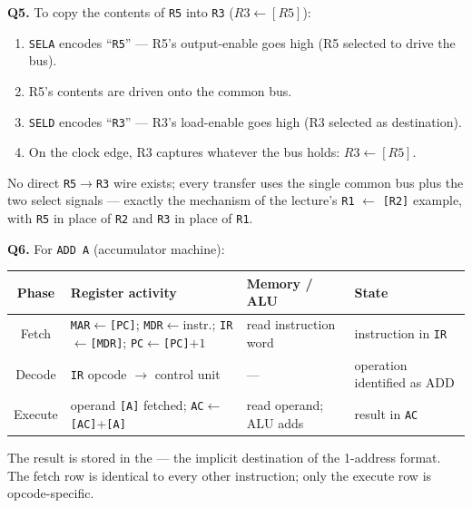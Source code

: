 \documentclass[11pt]{article}
\begin{document}
\textbf{Q5.} To copy the contents of \texttt{R5} into \texttt{R3} ($R3 \gets [R5]$):
\begin{enumerate}
  \item \texttt{SELA} encodes ``\texttt{R5}'' --- R5's output-enable goes high (R5 selected to drive the bus).
  \item R5's contents are driven onto the common bus.
  \item \texttt{SELD} encodes ``\texttt{R3}'' --- R3's load-enable goes high (R3 selected as destination).
  \item On the clock edge, R3 captures whatever the bus holds: $R3 \gets [R5]$.
\end{enumerate}
No direct \texttt{R5}$\to$\texttt{R3} wire exists; every transfer uses the single common bus plus the two select signals --- exactly the mechanism of the lecture's \texttt{R1} $\gets$ \texttt{[R2]} example, with \texttt{R5} in place of \texttt{R2} and \texttt{R3} in place of \texttt{R1}.

\textbf{Q6.} For \texttt{ADD A} (accumulator machine):
\begin{center}
\small
\begin{tabular}{@{}cp{3.4cm}p{3.6cm}p{3.4cm}@{}}
\toprule
\textbf{Phase} & \textbf{Register activity} & \textbf{Memory / ALU} & \textbf{State} \\
\midrule
Fetch &
  \texttt{MAR}$\gets$\texttt{[PC]}; \texttt{MDR}$\gets$instr.; \texttt{IR}$\gets$\texttt{[MDR]}; \texttt{PC}$\gets$\texttt{[PC]}$+1$ &
  read instruction word &
  instruction in \texttt{IR} \\
Decode &
  \texttt{IR} opcode $\to$ control unit &
  --- &
  operation identified as ADD \\
Execute &
  operand \texttt{[A]} fetched; \texttt{AC}$\gets$\texttt{[AC]}+\texttt{[A]} &
  read operand; ALU adds &
  result in \texttt{AC} \\
\bottomrule
\end{tabular}
\end{center}
The result is stored in the  --- the implicit destination of the 1-address format. The fetch row is identical to every other instruction; only the execute row is opcode-specific.
\end{document}
